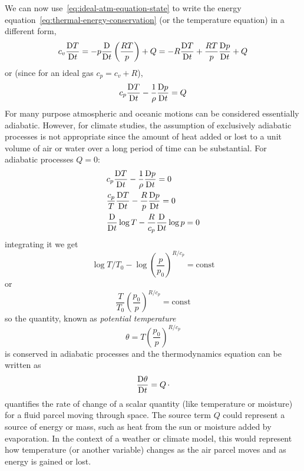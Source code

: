 We can now use~\ref{eq:ideal-atm-equation-state} to write the energy equation~\ref{eq:thermal-energy-conservation}
(or the temperature equation) in a different form,
\[
	c_v\frac{\mathrm{D} T}{\mathrm{D}t} = -p\frac{\mathrm{D} }{\mathrm{D}t}\left(\frac{R T}{p}\right)+ Q = -R\frac{\mathrm{D} T}{\mathrm{D}t} + \frac{RT}{p}\frac{\mathrm{D} p}{\mathrm{D}t} + Q
\]
or (since for an ideal gas $c_p = c_v +R$),
\[
	c_p\frac{\mathrm{D} T}{\mathrm{D}t}  - \frac{1}{\rho}\frac{\mathrm{D} p}{\mathrm{D}t} = Q
\]
For many purpose atmospheric and oceanic motions can be considered essentially adiabatic. However, for climate studies, the assumption of exclusively adiabatic processes is not appropriate since the amount of heat added or lost to a unit volume of air or water over a long period of time can be substantial. For adiabatic processes \(Q=0\):
\[
	\begin{aligned}
		 & c_p\frac{\mathrm{D} T}{\mathrm{D}t}  - \frac{1}{\rho}\frac{\mathrm{D} p}{\mathrm{D}t} = 0        \\
		 & \frac{c_p}{T}\frac{\mathrm{D} T}{\mathrm{D}t} -\frac{R}{p}\frac{\mathrm{D} p}{\mathrm{D}t} = 0   \\
		 & \frac{\mathrm{D} }{\mathrm{D}t}\log{T} - \frac{R}{c_p}\frac{\mathrm{D} }{\mathrm{D}t}\log{p} = 0
	\end{aligned}
\]
integrating it we get
\[\log{T/T_0} - \log{\left(\frac{p}{p_0}\right)^{R/c_p}} = \text{const}\]
or
\begin{equation}
	\frac{T}{T_0}\left(\frac{p_0}{p}\right)^{R/c_p} = \text{const}
	\label{eq:T-T0-adiabatic}
\end{equation}
so the quantity, known as \emph{potential temperature}
\begin{equation}
	\theta = T\left(\frac{p_0}{p}\right)^{R/c_p}
	\label{eq:potential-temperature-def}
\end{equation}
is conserved in adiabatic processes and the thermodynamics equation can be written as
\begin{equation}
	\frac{\mathrm{D} \theta}{\mathrm{D}t} = Q \, \cdot
	\label{eq:potential-temp-rate}
\end{equation}
\eq{\ref{eq:potential-temp-rate}} quantifies the rate of change of a scalar quantity
(like temperature or moisture) for a fluid parcel moving through space.
The source term $Q$ could represent a source of energy or mass, such as heat from the sun or moisture added by evaporation.
In the context of a weather or climate model, this would represent how temperature (or another variable)
changes as the air parcel moves and as energy is gained or lost.

